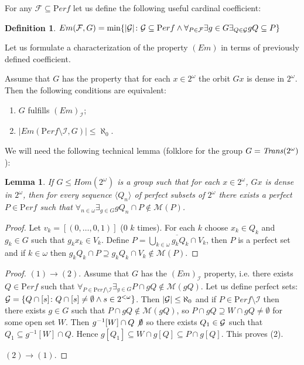 \documentclass[b5cutpaper, twoside, 11pt, leqno]{moravica}
\newcommand\trans{{\it Trans}(\ca)}
\newcommand{\ca}{2^{\omega}}
\newcommand{\cantor}{\ca}
\newcommand{\Perf}{{\mathrm Perf}}
\newcommand{\calF}{{\mathcal{F}}}
\newcommand{\cF}{\calF}
\newcommand{\calG}{{\cal G}}
\newcommand{\cG}{\calG}
\newcommand{\calI}{{\mathcal{I}}}
\newcommand{\meager}{\mathcal{M}}
\newtheorem{lemma}{Lemma}[section]
\theoremstyle{definition}
\newtheorem{definition}{Definition}[section]
\begin{document}
  For any $\cF \subseteq \Perf$ 
let us define the following useful cardinal coefficient:
\begin{definition}
$Em(\cF, G) = \min\{|\cG|\colon \cG\subseteq \Perf \wedge 
\forall_{P\in\cF} \exists{g\in G} \exists_{Q\in\cG} gQ \subseteq P\}$
\end{definition}

  Let us formulate a characterization of the property 
$(Em)$ in terms of previously defined coefficient.

Assume that $G$ has the property that for each $x\in\cantor$
the orbit $Gx$ is dense in $\cantor$.
Then the following conditions are equivalent:

\begin{enumerate}
\item
  $G$ fulfills $(Em)_{\calI}$; 
\item
  $|Em(\Perf\setminus \calI, G) | \leq \aleph_0$.
\end{enumerate}

  We will need the following technical lemma
(folklore for the group $G = \trans$):
\begin{lemma}\label{lemma-dense}
If $G\leq Hom(\cantor)$ is a group such that for each 
$x\in\cantor$, $Gx$ is dense in $\cantor$,
then for every sequence $\langle Q_n\rangle$
of perfect subsets of $\cantor$ there exists
a perfect $P\in\Perf$ such that 
$\forall_{n\in\omega} \exists_{g\in G} gQ_n \cap P 
\not \in \meager(P)$.
\end{lemma}
\begin{proof}
Let $v_k = [(0,\ldots,0, 1)]$ ($0$ $k$ times).
For each $k$ choose $x_k\in Q_k$ and $g_k\in G$
such that $g_k x_k \in V_k$. Define
$P = \overline{\bigcup_{k\in\omega}g_k Q_k \cap V_k}$,
then $P$ is a perfect set and if $k\in\omega$
then 
$g_k Q_k \cap P \supseteq g_k Q_k \cap V_k \not\in \meager(P)$.
\end{proof}

\begin{proof}%
$(1)\to (2)$.
Assume that $G$ has the $(Em)_\calI$ property,
i.e. there exists $Q\in\Perf$ such that
$\forall_{P\in\Perf\setminus\calI}\exists_{g\in G} 
P\cap gQ\not\in \meager(gQ)$. 
Let us define perfect sets:
$\cG = \{Q \cap [s] \colon Q \cap [s] \not= \emptyset \wedge
s\in 2^{<\omega}\}$.
Then $|\cG| \leq \aleph_0$ and if $P\in\Perf\setminus\calI$
then there exists $g\in G$ such that
$P\cap gQ \not\in\meager(gQ)$, so
$P\cap gQ \supseteq W\cap gQ \not= \emptyset$
for some open set $W$.
Then $g^{-1}[W] \cap Q \not\emptyset$
so there exists $Q_1\in \cG$ such that
$Q_1 \subseteq g^{-1}[W] \cap Q$.
Hence $g[Q_1] \subseteq W \cap g[Q] \subseteq P \cap g[Q]$.
This proves (2).

$(2)\to(1)$.

\end{proof}
\end{document}
